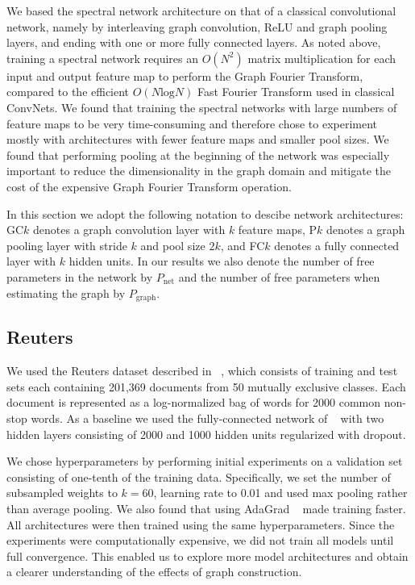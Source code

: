 We based the spectral network architecture on that of a classical convolutional network, namely by interleaving graph convolution, ReLU and graph pooling layers, and ending with one or more fully connected layers. As noted above, training a spectral network requires an $O(N^2)$ matrix multiplication for each input and output feature map to perform the Graph Fourier Transform, compared to the efficient $O(N \text{log} N)$ Fast Fourier Transform used in classical ConvNets. We found that training the spectral networks with large numbers of feature maps to be very time-consuming and therefore chose to experiment mostly with architectures with fewer feature maps and smaller pool sizes. We found that performing pooling at the beginning of the network was especially important to reduce the dimensionality in the graph domain and mitigate the cost of the expensive Graph Fourier Transform operation.

In this section we adopt the following notation to descibe network architectures: GC$k$ denotes a graph convolution layer with $k$ feature maps, P$k$ denotes a graph pooling layer with stride $k$ and pool size $2k$, and FC$k$ denotes a fully connected layer with $k$ hidden units. In our results we also denote the number of free parameters in the network by $P_\text{net}$ and the number of free parameters when estimating the graph by $P_\text{graph}$.
\subsection{Reuters}
We used the Reuters dataset described in ~\cite{JMLR:v15:srivastava14a}, which consists of training and test sets each containing 201,369 documents from 50 mutually exclusive classes. Each document is represented as a log-normalized bag of words for 2000 common non-stop words. As a baseline we used the fully-connected network of ~\cite{JMLR:v15:srivastava14a} with two hidden layers consisting of 2000 and 1000 hidden units regularized with dropout.  

 We chose hyperparameters by performing initial experiments on a validation set consisting of one-tenth of the training data. Specifically, we set the number of subsampled weights to $k=60$, learning rate to 0.01 and used max pooling rather than average pooling. We also found that using AdaGrad ~\cite{adagrad} made training faster. All architectures were then trained using the same hyperparameters.
Since the experiments were computationally expensive, we did not train all models until full convergence. This enabled us to explore more model architectures and obtain a clearer understanding of the effects of graph construction.  

